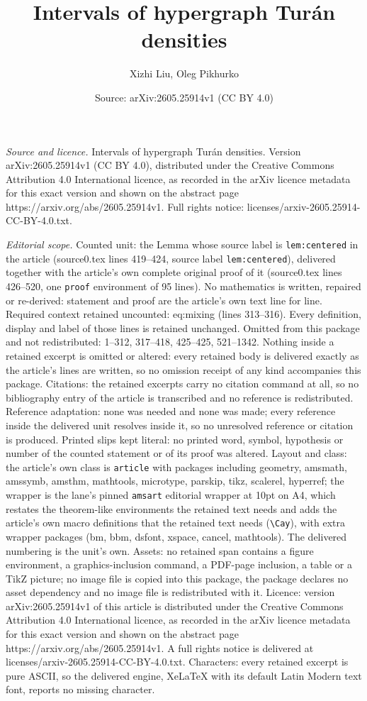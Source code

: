\documentclass[10pt,a4paper]{amsart}
\title[Intervals of hypergraph Tur\'an densities]{Intervals of hypergraph Tur\'an densities}
\author{Xizhi Liu, Oleg Pikhurko}
\date{Source: arXiv:2605.25914v1 (CC BY 4.0)}
\begin{document}
\maketitle

\noindent\emph{Source and licence.} Intervals of hypergraph Tur\'an densities. Version arXiv:2605.25914v1 (CC BY 4.0), distributed under the Creative Commons Attribution 4.0 International licence, as recorded in the arXiv licence metadata for this exact version and shown on the abstract page https://arxiv.org/abs/2605.25914v1. Full rights notice: licenses/arxiv-2605.25914-CC-BY-4.0.txt.\par\smallskip

\noindent\textit{Editorial scope.} Counted unit: the Lemma whose source label is \texttt{lem:centered} in the article (source0.tex lines 419--424, source label \texttt{lem:centered}), delivered together with the article's own complete original proof of it (source0.tex lines 426--520, one \texttt{proof} environment of 95 lines). No mathematics is written, repaired or re-derived: statement and proof are the article's own text line for line. Required context retained uncounted: eq:mixing (lines 313--316). Every definition, display and label of those lines is retained unchanged. Omitted from this package and not redistributed: 1--312, 317--418, 425--425, 521--1342. Nothing inside a retained excerpt is omitted or altered: every retained body is delivered exactly as the article's lines are written, so no omission receipt of any kind accompanies this package. Citations: the retained excerpts carry no citation command at all, so no bibliography entry of the article is transcribed and no reference is redistributed. Reference adaptation: none was needed and none was made; every reference inside the delivered unit resolves inside it, so no unresolved reference or citation is produced. Printed slips kept literal: no printed word, symbol, hypothesis or number of the counted statement or of its proof was altered. Layout and class: the article's own class is \texttt{article} with packages including geometry, amsmath, amssymb, amsthm, mathtools, microtype, parskip, tikz, scalerel, hyperref; the wrapper is the lane's pinned \texttt{amsart} editorial wrapper at 10pt on A4, which restates the theorem-like environments the retained text needs and adds the article's own macro definitions that the retained text needs (\texttt{\textbackslash Cay}), with extra wrapper packages (bm, bbm, dsfont, xspace, cancel, mathtools). The delivered numbering is the unit's own. Assets: no retained span contains a figure environment, a graphics-inclusion command, a PDF-page inclusion, a table or a TikZ picture; no image file is copied into this package, the package declares no asset dependency and no image file is redistributed with it. Licence: version arXiv:2605.25914v1 of this article is distributed under the Creative Commons Attribution 4.0 International licence, as recorded in the arXiv licence metadata for this exact version and shown on the abstract page https://arxiv.org/abs/2605.25914v1. A full rights notice is delivered at licenses/arxiv-2605.25914-CC-BY-4.0.txt. Characters: every retained excerpt is pure ASCII, so the delivered engine, XeLaTeX with its default Latin Modern text font, reports no missing character.
\end{document}
